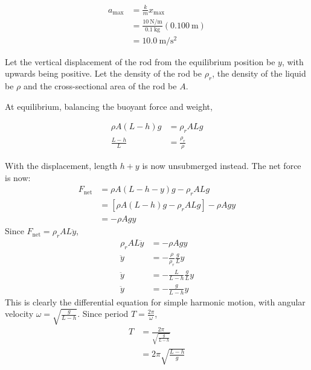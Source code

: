 \begin{solution}
\begin{subsolution}
\begin{enumerate}
            \begin{align*}
                a_{\mathrm{max}}&=\frac{k}{m}x_{\mathrm{max}}\\
                &=\frac{\qty{10}{\N\per\m}}{\qty{0.1}{\kg}}(\qty{0.100}{\m})\\
                &=\boxed{\qty{10.0}{\m\per\square\s}}
            \end{align*}
        \end{enumerate}
    \end{subsolution}
    \tcblower
    \begin{subsolution}
        Let the vertical displacement of the rod from the equilibrium position be $y$, with upwards being positive. Let the density of the rod be $\rho_r$, the density of the liquid be $\rho$ and the cross-sectional area of the rod be $A$.

        At equilibrium, balancing the buoyant force and weight,

        \begin{align*}
            \rho A (L-h) g&=\rho_r A L g\\
            \frac{L-h}{L}&=\frac{\rho_r}{\rho}
        \end{align*}

        With the displacement, length $h+y$ is now unsubmerged instead. The net force is now:
        \begin{align*}
            F_{\mathrm{net}}&=\rho A (L-h-y) g-\rho_r A L g\\
            &=[\rho A (L-h) g-\rho_r A L g]-\rho A g y\\
            &=-\rho A g y
        \end{align*}
        Since \(F_{\mathrm{net}}=\rho_r A L \ddot{y}\),
        \begin{align*}
            \rho_r A L \ddot{y}&=-\rho A g y\\
            \ddot{y}&=-\frac{\rho}{\rho_r} \frac{g}{L} y\\
            \ddot{y}&=-\frac{L}{L-h} \frac{g}{L} y\\
            \ddot{y}&=-\frac{g}{L-h} y
        \end{align*}
        This is clearly the differential equation for simple harmonic motion, with angular velocity \(\omega=\sqrt{\frac{g}{L-h}}\). Since period \(T=\frac{2\pi}{\omega}\),
        \begin{align*}
            T&=\frac{2\pi}{\sqrt{\frac{g}{L-h}}}\\
            &=\boxed{2\pi\sqrt{\frac{L-h}{g}}}
        \end{align*}
    \end{subsolution}
\end{solution}


